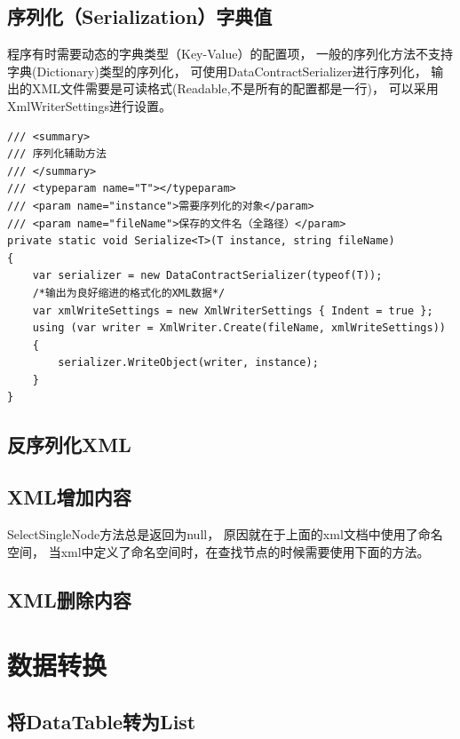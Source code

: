 \documentclass{book}
\begin{document}
\subsection{序列化（Serialization）字典值}

程序有时需要动态的字典类型（Key-Value）的配置项，
一般的序列化方法不支持字典(Dictionary)类型的序列化，
可使用DataContractSerializer进行序列化，
输出的XML文件需要是可读格式(Readable,不是所有的配置都是一行)，
可以采用XmlWriterSettings进行设置。

\begin{lstlisting}[language={[Sharp]C},caption=将字典序列化为XML文件]
/// <summary>
/// 序列化辅助方法
/// </summary>
/// <typeparam name="T"></typeparam>
/// <param name="instance">需要序列化的对象</param>
/// <param name="fileName">保存的文件名（全路径）</param>
private static void Serialize<T>(T instance, string fileName)
{
    var serializer = new DataContractSerializer(typeof(T));
    /*输出为良好缩进的格式化的XML数据*/
    var xmlWriteSettings = new XmlWriterSettings { Indent = true };
    using (var writer = XmlWriter.Create(fileName, xmlWriteSettings))
    {
        serializer.WriteObject(writer, instance);
    }
}
\end{lstlisting}

\subsection{反序列化XML}

\subsection{XML增加内容}

SelectSingleNode方法总是返回为null，
原因就在于上面的xml文档中使用了命名空间，
当xml中定义了命名空间时，在查找节点的时候需要使用下面的方法。



\subsection{XML删除内容}


\section{数据转换}

\subsection{将DataTable转为List}
\end{document}

